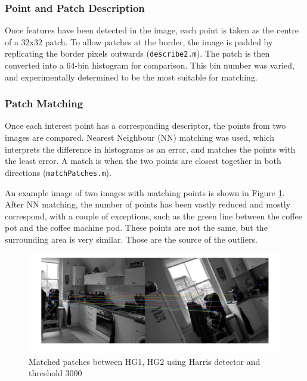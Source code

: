 \documentclass[a4paper, 10pt, conference]{ieeeconf}
\begin{document}
\subsubsection{Point and Patch Description}
Once features have been detected in the image, each point is taken as the centre of a 32x32 patch. To allow patches at the border, the image is padded by replicating the border pixels outwards (\texttt{describe2.m}). The patch is then converted into a 64-bin histogram for comparison. This bin number was varied, and experimentally determined to be the most suitable for matching.

\subsubsection{Patch Matching}
Once each interest point has a corresponding descriptor, the points from two images are compared. Nearest Neighbour (NN) matching was used, which interprets the difference in histograms as an error, and matches the points with the least error. A match is when the two points are closest together in both directions (\texttt{matchPatches.m}).

An example image of two images with matching points is shown in Figure \ref{fig:matched}. After NN matching, the number of points has been vastly reduced and mostly correspond, with a couple of exceptions, such as the green line between the coffee pot and the coffee machine pod. These points are not the same, but the surrounding area is very similar. Those are the source of the outliers.

\begin{figure}[!ht]
  \centering
  \includegraphics[width=\linewidth]{pic/matches}
  \caption{Matched patches between HG1, HG2 using Harris detector and threshold 3000}
  \vspace{-0.5cm}
  \label{fig:matched}
\end{figure}
\end{document}
